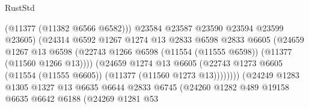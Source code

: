 \begin{lexlean}{RustStd}
\begin{coremodule}
                                            (@11377 (@11382 @6566 @6582)))
                                          @23584
                                          @23587
                                          @23590
                                          @23594
                                          @23599
                                          @23605)
                                        (@24314
                                          @6592
                                          @1267
                                          @1274
                                          @13
                                          @2833
                                          @6598
                                          @2833
                                          @6605
                                          (@24659
                                            @1267
                                            @13
                                            @6598
                                            (@22743
                                              @1266
                                              @6598
                                              (@11554 (@11555 @6598))
                                              (@11377 (@11560 @1266 @13))))
                                          (@24659
                                            @1274
                                            @13
                                            @6605
                                            (@22743
                                              @1273
                                              @6605
                                              (@11554 (@11555 @6605))
                                              (@11377 (@11560 @1273 @13))))))))
                                  (@24249
                                    @1283
                                    @1305
                                    @1327
                                    @13
                                    @6635
                                    @6644
                                    @2833
                                    @6745
                                    (@24260
                                      @1282
                                      @489
                                      @19158
                                      @6635
                                      @6642
                                      @6188
                                      (@24269
                                        @1281
                                        @53

\end{coremodule}
\end{lexlean}
